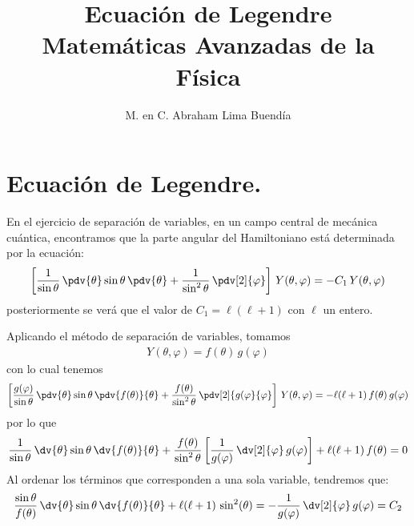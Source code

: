 

\title{Ecuación de Legendre\\ \large{Matemáticas Avanzadas de la Física}\vspace{-3ex}}
\author{M. en C. Abraham Lima Buendía}
\date{ }

\vspace{-4cm}
\maketitle
\fontsize{14}{14}\selectfont
\section{Ecuación de Legendre.}

En el ejercicio de separación de variables, en un campo central de mecánica cuántica, encontramos que la parte angular del Hamiltoniano está determinada por la ecuación:
\begin{align*}
\left[ \dfrac{1}{\sin \theta} \, \pdv{\theta} \sin \theta \, \pdv{\theta} + \dfrac{1}{\sin^{2} \theta} \, \pdv[2]{\varphi}  \right] \, Y (\theta, \varphi) = - C_{1} \, Y(\theta, \varphi)
\end{align*}
posteriormente se verá que el valor de $C_{1} = \ell (\ell +1)$ con $\ell$ un entero.
\par
Aplicando el método de separación de variables, tomamos
\begin{align*}
Y(\theta, \varphi) = f(\theta) \, g(\varphi)
\end{align*}
con lo cual tenemos
\begin{align*}
\left[ \dfrac{g(\varphi)}{\sin \theta} \, \pdv{\theta} \sin \theta \, \pdv{f(\theta)}{\theta} + \dfrac{f(\theta)}{\sin^{2} \theta} \, \pdv[2]{g(\varphi}{\varphi}  \right] \, Y (\theta, \varphi) = -  \ell (\ell + 1)\, f(\theta) \, g(\varphi)
\end{align*}
por lo que
\begin{align*}
\dfrac{1}{\sin \theta} \, \dv{\theta} \sin \theta \, \dv{f(\theta)}{\theta} + \dfrac{f(\theta)}{\sin^{2} \theta} \left[ \dfrac{1}{g(\varphi)} \, \dv[2]{\varphi} \, g(\varphi) \right] + \ell (\ell + 1) \, f(\theta) = 0
\end{align*}
Al ordenar los términos que corresponden a una sola variable, tendremos que:
\begin{align*}
\dfrac{\sin \theta}{f(\theta)} \, \dv{\theta} \sin \theta \, \dv{f(\theta)}{\theta} + \ell (\ell + 1) \, \sin^{2}(\theta) = - \dfrac{1}{g(\varphi)} \, \dv[2]{\varphi} \, g(\varphi) = C_{2} 
\end{align*}
